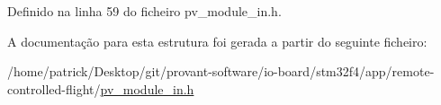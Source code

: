 Definido na linha 59 do ficheiro pv\-\_\-module\-\_\-in.\-h.



A documentação para esta estrutura foi gerada a partir do seguinte ficheiro\-:\begin{DoxyCompactItemize}
\item 
/home/patrick/\-Desktop/git/provant-\/software/io-\/board/stm32f4/app/remote-\/controlled-\/flight/\hyperlink{pv__module__in_8h}{pv\-\_\-module\-\_\-in.\-h}\end{DoxyCompactItemize}

